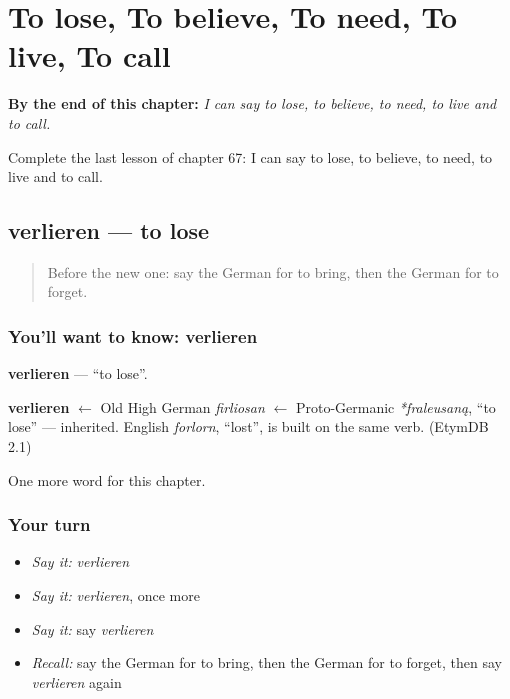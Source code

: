 
\chapter{To lose, To believe, To need, To live, To call}
\label{ch:ge-to-lose-to-believe-to-need-to-live-to-call}

\begin{chapteropening}
\textbf{By the end of this chapter:} \emph{I can say to lose, to believe, to need, to live and to call.}

Complete the last lesson of chapter 67: I can say to lose, to believe, to need, to live and to call.
\end{chapteropening}

\section[verlieren]{verlieren — to lose}

\label{lesson:GE-C67-verlieren}



\begin{quote}
Before the new one: say the German for to bring, then the German for to forget.
\end{quote}

\subsection*{You'll want to know: verlieren}
\textbf{verlieren} — \textquotedblleft{}to lose\textquotedblright{}.

\begin{cousinweb}
\textbf{verlieren} $\leftarrow$ Old High German \emph{firliosan} $\leftarrow$ Proto-Germanic \emph{*fraleusaną}, \textquotedblleft{}to lose\textquotedblright{} — inherited. English \emph{forlorn}, \textquotedblleft{}lost\textquotedblright{}, is built on the same verb. (EtymDB 2.1)
\end{cousinweb}

\begin{grammarlens}[title={What you've built}]
One more word for this chapter.
\end{grammarlens}

\subsection*{Your turn}
\begin{itemize}
\raggedright
  \item \emph{Say it:} \emph{verlieren}
  \item \emph{Say it:} \emph{verlieren}, once more
  \item \emph{Say it:} say \emph{verlieren}
  \item \emph{Recall:} say the German for to bring, then the German for to forget, then say \emph{verlieren} again
\end{itemize}

